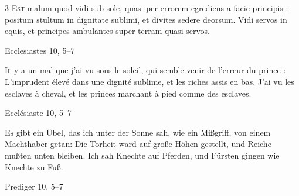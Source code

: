 \documentclass[12pt,a4paper]{article}
\begin{document}
\thispagestyle{empty}
\setlength{\columnsep}{5mm}
\setlength{\columnseprule}{0.2pt}

\begin{paracol}{3}
\noindent\lettrine[lines=2]{E}{st} malum quod vidi sub sole, quasi per errorem egrediens a facie principis : positum stultum in dignitate sublimi, et divites sedere deorsum. Vidi servos in equis, et principes ambulantes super terram quasi servos.
\begin{flushright}\small Ecclesiastes 10, 5--7\end{flushright}
\switchcolumn

\noindent\lettrine[lines=2]{I}{l} y a un mal que j’ai vu sous le soleil, qui semble venir de l’erreur du prince : L’imprudent élevé dans une dignité sublime, et les riches assis en bas. J’ai vu les esclaves à cheval, et les princes marchant à pied comme des esclaves.
\begin{flushright}\small Ecclésiaste 10, 5--7\end{flushright}
\switchcolumn

\noindent\lettrine[lines=2]{E}{s} gibt ein Übel, das ich unter der Sonne sah, wie ein Mißgriff, von einem Machthaber getan: Die Torheit ward auf große Höhen gestellt, und Reiche mußten unten bleiben. Ich sah Knechte auf Pferden, und Fürsten gingen wie Knechte zu Fuß.
\begin{flushright}\small Prediger 10, 5--7\end{flushright}

%
%
\switchcolumn*
\end{paracol}
\end{document}
